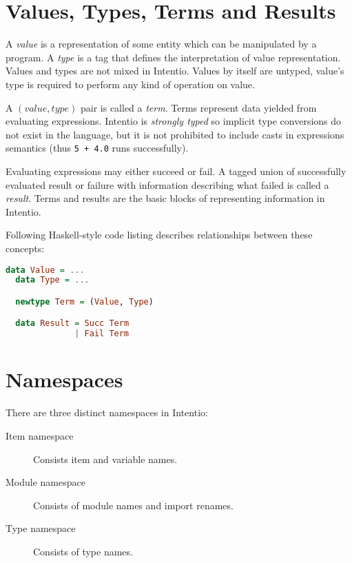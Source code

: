 \section{Values, Types, Terms and Results}

A \emph{value} is a representation of some entity which can be manipulated by a program. A \emph{type} is a tag that defines the interpretation of value representation. Values and types are not mixed in Intentio. Values by itself are untyped, value's type is required to perform any kind of operation on value.

A \((value, type)\) pair is called a \emph{term}. Terms represent data yielded from evaluating expressions. Intentio is \emph{strongly typed} so implicit type conversions do not exist in the language, but it is not prohibited to include casts in expressions semantics (thus \lstinline{5 + 4.0} runs successfully).

Evaluating expressions may either succeed or fail. A tagged union of successfully evaluated result or failure with information describing what failed is called a \emph{result}. Terms and results are the basic blocks of representing information in Intentio.

Following Haskell-style code listing describes relationships between these concepts:

\begin{lstlisting}[language=Haskell]
  data Value = ...
  data Type = ...

  newtype Term = (Value, Type)

  data Result = Succ Term
              | Fail Term
\end{lstlisting}


\section{Namespaces}

There are three distinct namespaces in Intentio:

\begin{description}
  \item [Item namespace] Consists item and variable names.
  \item [Module namespace] Consists of module names and import renames.
  \item [Type namespace] Consists of type names.
\end{description}


